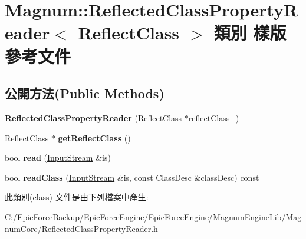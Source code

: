\hypertarget{class_magnum_1_1_reflected_class_property_reader}{}\section{Magnum\+:\+:Reflected\+Class\+Property\+Reader$<$ Reflect\+Class $>$ 類別 樣版 參考文件}
\label{class_magnum_1_1_reflected_class_property_reader}
\subsection*{公開方法(Public Methods)}
\begin{DoxyCompactItemize}
\item 
{\bfseries Reflected\+Class\+Property\+Reader} (Reflect\+Class $\ast$reflect\+Class\+\_\+)\hypertarget{class_magnum_1_1_reflected_class_property_reader_a07522171d5431465c97d429129c79f9f}{}\label{class_magnum_1_1_reflected_class_property_reader_a07522171d5431465c97d429129c79f9f}

\item 
Reflect\+Class $\ast$ {\bfseries get\+Reflect\+Class} ()\hypertarget{class_magnum_1_1_reflected_class_property_reader_a4e65d25728d5b00719f67f30fc09fc90}{}\label{class_magnum_1_1_reflected_class_property_reader_a4e65d25728d5b00719f67f30fc09fc90}

\item 
bool {\bfseries read} (\hyperlink{class_magnum_1_1_input_stream}{Input\+Stream} \&is)\hypertarget{class_magnum_1_1_reflected_class_property_reader_ac955c64f9690f05417a1e30b06947d00}{}\label{class_magnum_1_1_reflected_class_property_reader_ac955c64f9690f05417a1e30b06947d00}

\item 
bool {\bfseries read\+Class} (\hyperlink{class_magnum_1_1_input_stream}{Input\+Stream} \&is, const Class\+Desc \&class\+Desc) const \hypertarget{class_magnum_1_1_reflected_class_property_reader_a23c8523f428c4c88699f892db5e7e2b5}{}\label{class_magnum_1_1_reflected_class_property_reader_a23c8523f428c4c88699f892db5e7e2b5}

\end{DoxyCompactItemize}


此類別(class) 文件是由下列檔案中產生\+:\begin{DoxyCompactItemize}
\item 
C\+:/\+Epic\+Force\+Backup/\+Epic\+Force\+Engine/\+Epic\+Force\+Engine/\+Magnum\+Engine\+Lib/\+Magnum\+Core/Reflected\+Class\+Property\+Reader.\+h\end{DoxyCompactItemize}

